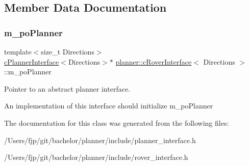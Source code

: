 \subsection{Member Data Documentation}
\mbox{\label{classplanner_1_1c_rover_interface_a8e1ffb06f3301b9440da125666ecdc4f}} 
\subsubsection{\texorpdfstring{m\+\_\+po\+Planner}{m\_poPlanner}}
{\footnotesize\ttfamily template$<$size\+\_\+t Directions$>$ \\
\mbox{\hyperlink{classplanner_1_1c_planner_interface}{c\+Planner\+Interface}}$<$Directions$>$$\ast$ \mbox{\hyperlink{classplanner_1_1c_rover_interface}{planner\+::c\+Rover\+Interface}}$<$ Directions $>$\+::m\+\_\+po\+Planner\hspace{0.3cm}{\ttfamily [protected]}}



Pointer to an abstract planner interface. 

An implementation of this interface should initialize m\+\_\+po\+Planner 

The documentation for this class was generated from the following files\+:\begin{DoxyCompactItemize}
\item 
/\+Users/fjp/git/bachelor/planner/include/planner\+\_\+interface.\+h\item 
/\+Users/fjp/git/bachelor/planner/include/rover\+\_\+interface.\+h\end{DoxyCompactItemize}
